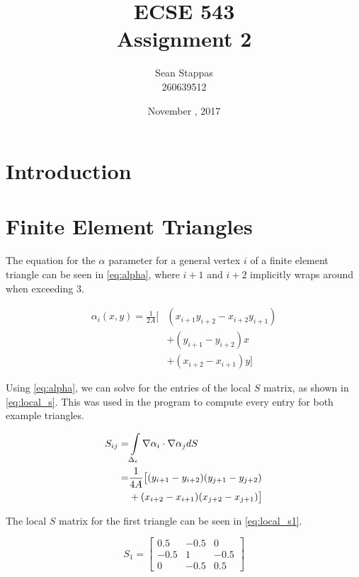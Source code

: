 \documentclass[a4paper,titlepage]{article}
\title{\textbf{ECSE 543 \\ Assignment 2}}
\author{Sean Stappas \\ 260639512}
\date{November \nth{13}, 2017}
\begin{document}
	\sloppy
	\maketitle
	
	\tableofcontents
	
	
	\twocolumn
	
	\section*{Introduction}
	
	\section{Finite Element Triangles}
	
	The equation for the $\alpha$ parameter for a general vertex $i$ of a finite element triangle can be seen in \cref{eq:alpha}, where $i+1$ and $i+2$ implicitly wraps around when exceeding 3.
	
	\begin{equation} \label{eq:alpha}
		\begin{split}
			\alpha_i(x, y) = \frac{1}{2A} \big[
			& (x_{i+1}y_{i+2} - x_{i+2}y_{i+1}) \\
			& + (y_{i+1} - y_{i+2})x \\
			& + (x_{i+2} - x_{i+1})y \big]
		\end{split}
	\end{equation}
	
	Using \cref{eq:alpha}, we can solve for the entries of the local $S$ matrix, as shown in \cref{eq:local_s}. This was used in the program to compute every entry for both example triangles.
	
	\begin{equation} \label{eq:local_s}
		\begin{split}
			S_{ij} 
			= &\int\displaylimits_{\Delta_e}\nabla\alpha_i\cdot\nabla\alpha_j dS \\
			= &\frac{1}{4A} \big[ (y_{i+1} - y_{i+2})(y_{j+1} - y_{j+2}) \\
			&+ (x_{i+2} - x_{i+1})(x_{j+2} - x_{j+1})
			\big]
		\end{split}
	\end{equation}
	
	The local $S$ matrix for the first triangle can be seen in \cref{eq:local_s1}.
	
	\begin{equation} \label{eq:local_s1}
		S_1 =
			\begin{bmatrix}
				0.5  & -0.5 & 0 \\
				-0.5 & 1    & -0.5 \\
				0    & -0.5 & 0.5 
			\end{bmatrix}
	\end{equation}
	
\end{document}
